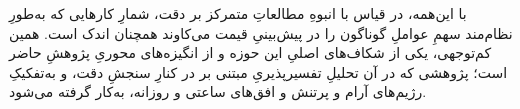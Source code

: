 با این‌همه، در قیاس با انبوهِ مطالعاتِ متمرکز بر دقت، شمارِ کارهایی که به‌طورِ
نظام‌مند سهمِ عواملِ گوناگون را در پیش‌بینیِ قیمت می‌کاوند همچنان اندک است. همین
کم‌توجهی، یکی از شکاف‌های اصلیِ این حوزه و از انگیزه‌های محوریِ پژوهشِ حاضر است؛
پژوهشی که در آن تحلیلِ تفسیرپذیریِ مبتنی بر  در کنارِ سنجشِ دقت، و
به‌تفکیکِ رژیم‌های آرام و پرتنش و افق‌های ساعتی و روزانه، به‌کار گرفته می‌شود.
